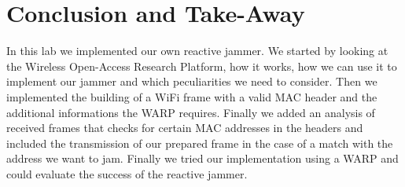 \documentclass[sigconf]{acmart}
\begin{document}

\section{Conclusion and Take-Away}
In this lab we implemented our own reactive jammer. We started by looking at the Wireless Open-Access Research Platform,
how it works, how we can use it to implement our jammer and which peculiarities we need to consider. Then we implemented
the building of a WiFi frame with a valid MAC header and the additional informations the WARP requires. Finally we added
an analysis of received frames that checks for certain MAC addresses in the headers and included the transmission of our
prepared frame in the case of a match with the address we want to jam. Finally we tried our implementation using a WARP
and could evaluate the success of the reactive jammer.
\end{document}
